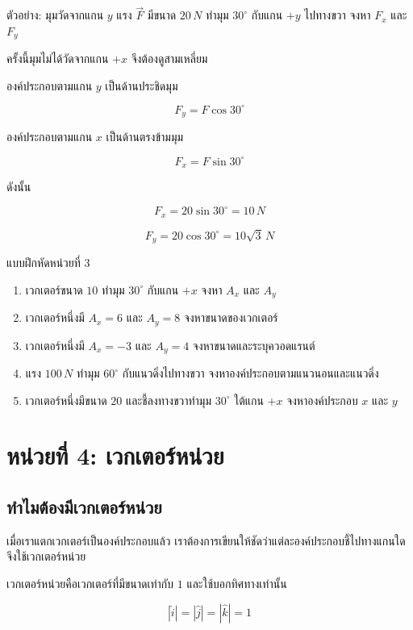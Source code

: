 \documentclass[12pt,a4paper]{report}
\begin{document}
\begin{examplebox}{ตัวอย่าง: มุมวัดจากแกน $y$}
แรง $\vec{F}$ มีขนาด $20\,\si{N}$ ทำมุม $30^\circ$ กับแกน $+y$ ไปทางขวา จงหา $F_x$ และ $F_y$

ครั้งนี้มุมไม่ได้วัดจากแกน $+x$ จึงต้องดูสามเหลี่ยม

องค์ประกอบตามแกน $y$ เป็นด้านประชิดมุม

\[
F_y=F\cos30^\circ
\]

องค์ประกอบตามแกน $x$ เป็นด้านตรงข้ามมุม

\[
F_x=F\sin30^\circ
\]

ดังนั้น

\[
F_x=20\sin30^\circ=10\,\si{N}
\]

\[
F_y=20\cos30^\circ=10\sqrt{3}\,\si{N}
\]
\end{examplebox}

\begin{exercisebox}{แบบฝึกหัดหน่วยที่ 3}
\begin{enumerate}
    \item เวกเตอร์ขนาด $10$ ทำมุม $30^\circ$ กับแกน $+x$ จงหา $A_x$ และ $A_y$
    \item เวกเตอร์หนึ่งมี $A_x=6$ และ $A_y=8$ จงหาขนาดของเวกเตอร์
    \item เวกเตอร์หนึ่งมี $A_x=-3$ และ $A_y=4$ จงหาขนาดและระบุควอดแรนต์
    \item แรง $100\,\si{N}$ ทำมุม $60^\circ$ กับแนวดิ่งไปทางขวา จงหาองค์ประกอบตามแนวนอนและแนวดิ่ง
    \item เวกเตอร์หนึ่งมีขนาด $20$ และชี้ลงทางขวาทำมุม $30^\circ$ ใต้แกน $+x$ จงหาองค์ประกอบ $x$ และ $y$
\end{enumerate}
\end{exercisebox}

\section{หน่วยที่ 4: เวกเตอร์หน่วย}

\subsection{ทำไมต้องมีเวกเตอร์หน่วย}

เมื่อเราแตกเวกเตอร์เป็นองค์ประกอบแล้ว เราต้องการเขียนให้ชัดว่าแต่ละองค์ประกอบชี้ไปทางแกนใด จึงใช้เวกเตอร์หน่วย

เวกเตอร์หน่วยคือเวกเตอร์ที่มีขนาดเท่ากับ $1$ และใช้บอกทิศทางเท่านั้น

\[
|\hat{i}|=|\hat{j}|=|\hat{k}|=1
\]
\end{document}
